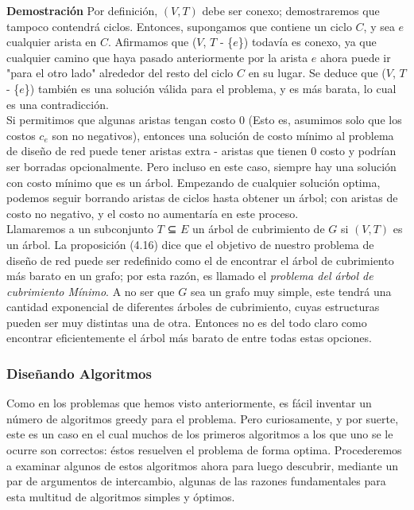 \documentclass[a4paper, 12pt]{book}
\theoremstyle{dotless}
\begin{document}
\textbf{Demostración} Por definición, $(V,T)$ debe ser conexo; demostraremos que tampoco contendrá ciclos. Entonces, supongamos que contiene un ciclo $C$, y sea $e$ cualquier
arista en $C$. Afirmamos que ($V$, $T$ - \{$e$\}) todavía es conexo, ya que cualquier camino que haya pasado anteriormente por la arista $e$ ahora puede ir "para el otro lado" alrededor del resto
del ciclo $C$ en su lugar. Se deduce que ($V$, $T$ - \{$e$\}) también es una solución válida para el
problema, y es más barata, lo cual es una contradicción.\\

Si permitimos que algunas aristas tengan costo 0 (Esto es, asumimos solo que los costos $c_e$ son no negativos), entonces una solución de costo mínimo al problema de diseño de red puede tener aristas extra -  aristas que tienen 0 costo y podrían ser borradas opcionalmente. Pero incluso en este caso, siempre hay una solución con costo mínimo que es un árbol. Empezando de cualquier solución optima, podemos seguir borrando aristas de ciclos hasta obtener un árbol; con aristas de costo no negativo, y el costo no aumentaría en este proceso.\\
	
Llamaremos a un subconjunto $T$ ⊆ $E$ un árbol de cubrimiento de $G$ si $(V,T)$ es un árbol. La proposición (4.16) dice que el objetivo de nuestro problema de diseño de red puede ser redefinido como el de encontrar el árbol de cubrimiento más barato en un grafo; por esta razón, es llamado el \textit{problema del árbol de cubrimiento Mínimo}. A no ser que $G$ sea un grafo muy simple, este tendrá una cantidad exponencial de diferentes árboles de cubrimiento, cuyas estructuras pueden ser muy distintas una de otra. Entonces no es del todo claro como encontrar eficientemente el árbol más barato de entre todas estas opciones.\\
    
\subsubsection*{Diseñando Algoritmos}
Como en los problemas que hemos visto anteriormente, es fácil inventar un número de algoritmos greedy para el problema. Pero curiosamente, y por suerte, este es un caso en el cual muchos de los primeros algoritmos a los que uno se le ocurre son correctos: éstos resuelven el problema de forma optima. Procederemos a examinar algunos de estos algoritmos ahora para luego descubrir, mediante un par de argumentos de intercambio, algunas de las razones fundamentales para esta multitud de algoritmos simples y óptimos.\\
\end{document}
